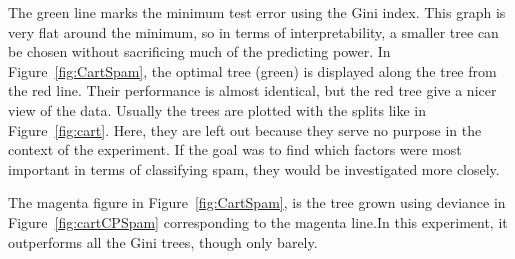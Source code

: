 The green line marks the minimum test error using the Gini index. This graph is very flat around the minimum, so in terms of interpretability, a smaller tree can be chosen without sacrificing much of the predicting power. In Figure~\ref{fig:CartSpam}, the optimal tree (green) is displayed along the tree from the red line. Their performance is almost identical, but the red tree give a nicer view of the data. Usually the trees are plotted with the splits like in Figure~\ref{fig:cart}. Here, they are left out because they serve no purpose in the context of the experiment. If the goal was to find which factors were most important in terms of classifying spam, they would be investigated more closely.

The magenta figure in Figure~\ref{fig:CartSpam}, is the tree grown using deviance in Figure~\ref{fig:cartCPSpam} corresponding to the magenta line.In this experiment, it outperforms all the Gini trees, though only barely. 

